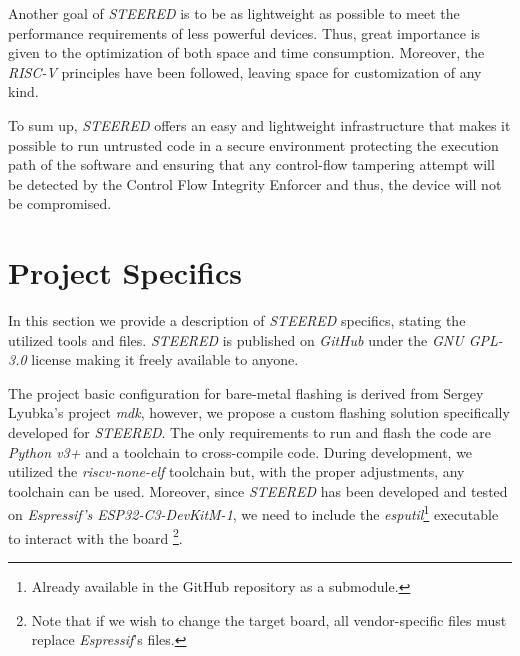 Another goal of \textit{STEERED} is to be as lightweight as possible to meet the
performance requirements of less powerful devices. Thus, great importance is given
to the optimization of both space and time consumption. Moreover, the \textit{RISC-V}
principles have been followed, leaving space for customization of any kind.

To sum up, \textit{STEERED} offers an easy and lightweight infrastructure that makes
it possible to run untrusted code in a secure environment protecting the execution
path of the software and ensuring that any control-flow tampering attempt will be
detected by the Control Flow Integrity Enforcer and thus, the device will not be
compromised.

\section{Project Specifics}
\label{sec:project_specifics}

In this section we provide a description of \textit{STEERED} specifics, stating the
utilized tools and files. \textit{STEERED} is published on \textit{GitHub}\cite{repo}
under the \textit{GNU GPL-3.0} license\cite{gpl3} making it freely available to anyone.

The project basic configuration for bare-metal flashing is derived from Sergey Lyubka's
project \textit{mdk}\cite{mdk}, however, we propose a custom flashing solution specifically
developed for \textit{STEERED}. The only requirements to run and flash the code are
\textit{Python v3+} and a toolchain to cross-compile code. During development,
we utilized the \textit{riscv-none-elf}\cite{toolchain} toolchain but, with the proper
adjustments, any toolchain can be used. Moreover, since \textit{STEERED} has been
developed and tested on \textit{Espressif's ESP32-C3-DevKitM-1}\cite{esp32c3},
we need to include the \textit{esputil}\footnote{Already available in the GitHub
repository as a submodule\cite{esputil}.} executable to interact with the board
\footnote{Note that if we wish to change the target board, all vendor-specific files
must replace \textit{Espressif}'s files.}.

